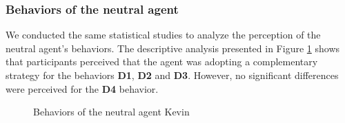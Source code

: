 \documentclass{llncs}
\begin{document}
\subsubsection{Behaviors of the neutral agent}

We conducted the same statistical studies to analyze the perception of the neutral agent's behaviors. The descriptive analysis presented in Figure \ref{fig:neutre} shows that participants perceived that the agent was adopting a complementary strategy for the behaviors \textbf{D1}, \textbf{D2} and \textbf{D3}. However, no significant differences were perceived for the \textbf{D4} behavior.

\begin{figure}[!tb]
	\centering
	
	\caption{Behaviors of the neutral agent Kevin}
	\label{fig:neutre}
\end{figure}
\end{document}
